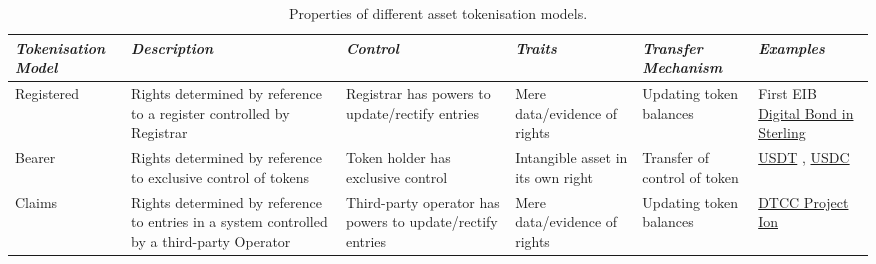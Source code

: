 \renewcommand\tabularxcolumn[1]{m{#1}}%
\begin{table}[]
    \centering

    \begin{tabularx}{\textwidth} { 
           >{\centering\arraybackslash}X 
           >{\centering\arraybackslash}X
           >{\centering\arraybackslash}X
           >{\centering\arraybackslash}X
           >{\centering\arraybackslash}X
           >{\centering\arraybackslash}X  }
         \toprule[1.5pt]
         \textit{Tokenisation Model} & \textit{Description} & \textit{Control} & \textit{Traits} & \textit{Transfer Mechanism} & \textit{Examples} \\
         \midrule[1.5pt]
         
         Registered & \vspace{10pt} Rights determined by reference to a register controlled by Registrar \vspace{1pt} & Registrar has powers to update/rectify entries & Mere data/evidence of rights & Updating token balances & First EIB \href{https://www.eib.org/en/press/all/2023-030-eib-issues-its-first-ever-digital-bond-in-british-pounds}{Digital Bond in Sterling} \citep{eib_bond} \\
    
         \hline

         Bearer & \vspace{10pt} Rights determined by reference to exclusive control of tokens \vspace{10pt} & Token holder has exclusive control & Intangible asset in its own right & Transfer of control of token & \href{https://tether.to/en/why-tether}{USDT} \citep{usdt}, \href{https://www.circle.com/en/usdc}{USDC} \citep{usdc} \\ 

         \hline

         Claims & \vspace{10pt} Rights determined by reference to entries in a system controlled by a third-party Operator \vspace{10pt} & Third-party operator has powers to update/rectify entries & Mere data/evidence of rights & Updating token balances & \href{https://www.dtcc.com/news/2022/august/22/project-ion}{DTCC Project Ion} \citep{project_ion} \\

         \bottomrule[1.5pt]

    \end{tabularx}

    \caption{Properties of different asset tokenisation models.}
    \label{tab:tokenisation_models}
\end{table}


